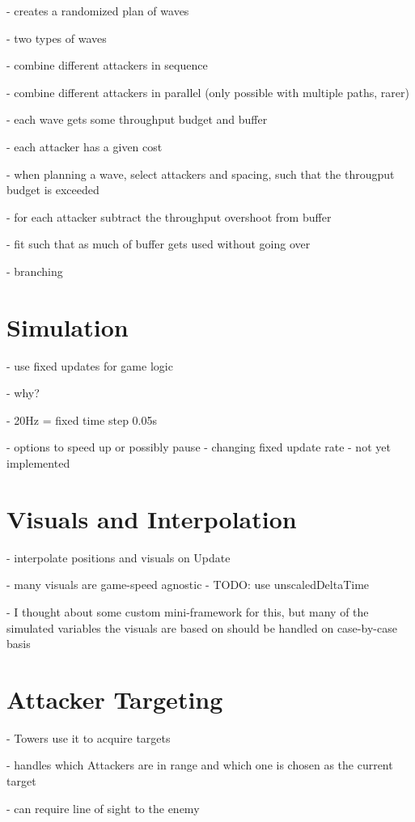- creates a randomized plan of waves

- two types of waves

- combine different attackers in sequence

- combine different attackers in parallel (only possible with multiple paths, rarer)

- each wave gets some throughput budget and buffer

- each attacker has a given cost

- when planning a wave, select attackers and spacing, such that the througput budget is exceeded

- for each attacker subtract the throughput overshoot from buffer

- fit such that as much of buffer gets used without going over

- branching

\section{Simulation}

- use fixed updates for game logic

- why?

- 20Hz = fixed time step 0.05s

- options to speed up or possibly pause - changing fixed update rate - not yet implemented

\section{Visuals and Interpolation}

- interpolate positions and visuals on Update

- many visuals are game-speed agnostic     - TODO: use unscaledDeltaTime

- I thought about some custom mini-framework for this, but many of the simulated variables the visuals are based on should be handled on case-by-case basis

\section{Attacker Targeting}

- Towers use it to acquire targets

- handles which Attackers are in range and which one is chosen as the current target

- can require line of sight to the enemy

